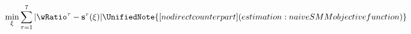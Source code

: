   \begin{equation}
    \begin{gathered}
      \begin{aligned}
        \min_{\xi} \sum_{\tau=1}^{7} |\wRatio^{\tau} -\mathbf{s}^{\tau}(\xi)|  \label{eq:naivePowell}
        \UnifiedNote{[no direct counterpart] (estimation: naive SMM objective function)}
      \end{aligned}
    \end{gathered}
  \end{equation}
